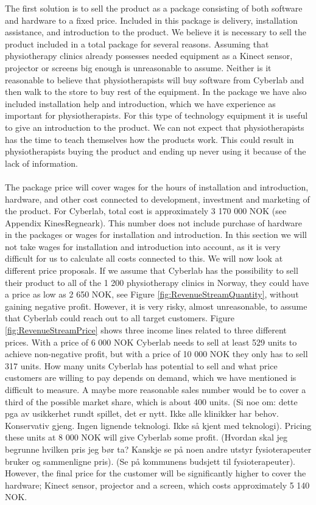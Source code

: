 The first solution is to sell the product as a package consisting of both software and hardware to a fixed price. Included in this package is delivery, installation assistance, and introduction to the product. We believe it is necessary  to sell the product included in a total package for several reasons. Assuming that physiotherapy clinics already possesses needed equipment as a Kinect sensor, projector or screens big enough is unreasonable to assume. Neither is it reasonable to believe that physiotherapists will buy software from Cyberlab and then walk to the store to buy rest of the equipment. In the package we have also included installation help and introduction, which we have experience as important for physiotherapists. For this type of technology equipment it is useful to give an introduction to the product. We can not expect that physiotherapists has the time to teach themselves how the products work. This could result in physiotherapists buying the product and ending up never using it because of the lack of information. \\ \\
The package price will cover wages for the hours of installation and introduction, hardware, and other cost connected to development, investment and marketing of the product. For Cyberlab, total cost is approximately 3 170 000 NOK (see Appendix KinesRegneark). This number does not include purchase of hardware in the packages or wages for installation and introduction. In this section we will not take wages for installation and introduction into account, as it is very difficult for us to calculate all costs connected to this. We will now look at different price proposals. If we assume that Cyberlab has the possibility to sell their product to all of the 1 200 physiotherapy clinics in Norway, they could have a price as low as 2 650 NOK, see Figure \ref{fig:RevenueStreamQuantity}, without gaining negative profit. However, it is very risky, almost unreasonable, to assume that Cyberlab could reach out to all target customers. Figure \ref{fig:RevenueStreamPrice} shows three income lines related to three different prices. With a price of 6 000 NOK Cyberlab needs to sell at least 529 units to achieve non-negative profit, but with a price of 10 000 NOK they only has to sell 317 units. How many units Cyberlab has potential to sell and what price customers are willing to pay depends on demand, which we have mentioned is difficult to measure. A maybe more reasonable sales number would be to cover a third of the possible market share, which is about 400 units. (Si noe om: dette pga av usikkerhet rundt spillet, det er nytt. Ikke alle klinikker har behov. Konservativ gjeng. Ingen lignende teknologi. Ikke s{å} kjent med teknologi). Pricing these units at 8 000 NOK will give Cyberlab some profit. (Hvordan skal jeg begrunne hvilken pris jeg b{ø}r ta? Kanskje se p{å} noen andre utstyr fysioterapeuter bruker og sammenligne pris). (Se p{å} kommunens budsjett til fysioterapeuter). However, the final price for the customer will be significantly higher to cover the hardware; Kinect sensor, projector and a screen, which costs approximately 5 140 NOK.\\ \\

